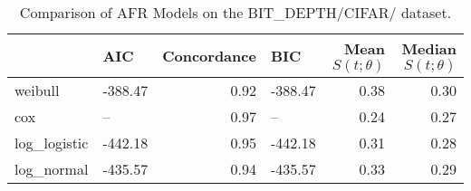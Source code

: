 \begin{table}
\caption{Comparison of AFR Models on the BIT_DEPTH/CIFAR/ dataset.}
\label{tab:bit_depth/cifar/}
\begin{tabular}{llrlrr}
\toprule
 & AIC & Concordance & BIC & Mean $S(t;\theta)$ & Median $S(t;\theta)$ \\
\midrule
weibull & -388.47 & 0.92 & -388.47 & 0.38 & 0.30 \\
cox & -- & 0.97 & -- & 0.24 & 0.27 \\
log_logistic & -442.18 & 0.95 & -442.18 & 0.31 & 0.28 \\
log_normal & -435.57 & 0.94 & -435.57 & 0.33 & 0.29 \\
\bottomrule
\end{tabular}
\end{table}
